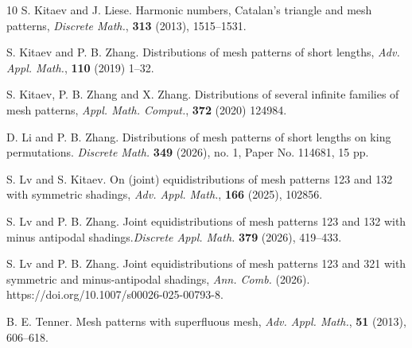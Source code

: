 \documentclass[12pt]{article}
\begin{document}
\begin{thebibliography}{10}
 S. Kitaev and J. Liese. Harmonic numbers, Catalan's triangle and mesh patterns, {\em Discrete Math.}, {\bf 313} (2013), 1515--1531.

 S. Kitaev and P. B. Zhang. Distributions of mesh patterns of short lengths, {\em Adv. Appl. Math.}, {\bf 110} (2019) 1--32.

  S. Kitaev, P. B. Zhang and X. Zhang. Distributions of several infinite families of mesh patterns, {\em Appl. Math. Comput.}, {\bf 372} (2020) 124984.

 D. Li and P. B. Zhang. Distributions of mesh patterns of short lengths on king permutations. {\em Discrete Math.} {\bf 349} (2026), no. 1, Paper No. 114681, 15 pp.

 S. Lv  and S. Kitaev. On (joint) equidistributions of mesh patterns 123 and 132 with symmetric shadings, {\em Adv. Appl. Math.}, {\bf 166} (2025), 102856.

 S. Lv and P. B. Zhang. Joint equidistributions of mesh patterns 123 and 132 with minus antipodal shadings.{\em Discrete Appl. Math.} {\bf 379} (2026), 419--433.

 S. Lv and P. B. Zhang. Joint equidistributions of mesh patterns 123 and 321 with symmetric and minus-antipodal shadings, {\em Ann. Comb.} (2026). https://doi.org/10.1007/s00026-025-00793-8.

  B. E. Tenner. Mesh patterns with superfluous mesh, {\em Adv. Appl. Math.}, {\bf 51} (2013), 606--618.
	
\end{thebibliography}
\end{document}
